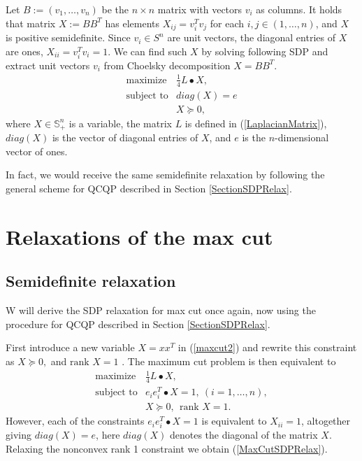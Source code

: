 \documentclass[12pt]{book}
\theoremstyle{definition}
\begin{document}
Let $B := (v_1,\dots ,v_n)$ be the $n\times n$ matrix with vectors $v_i$ as columns. 
It holds that matrix $X:= BB^T$ has elements $ X_{ij} = v_i^Tv_j $ for each $i,j\in (1,\dots,n)$, and $X$ is positive semidefinite.
Since $v_i\in S^n$ are unit vectors, the diagonal entries of $X$ are ones, $X_{ii} = v_i^Tv_i = 1$.
We can find such $X$ by solving following SDP and extract unit vectors $v_i$ from Choelsky decomposition $X = BB^T$.
\begin{equation}
\label{MaxCutSDPRelax}
\begin{array}{ll}
\mbox{maximize} & \frac{1}{4}L\bullet X, \\
\mbox{subject to} & diag(X) = e \\
&	X\succeq 0,
\end{array}
\end{equation} 
where $X\in\mathbb{S}^n_+$ is a variable, the matrix $L$ is defined in (\ref{LaplacianMatrix}), $diag(X)$ is the vector of diagonal entries of $X$, and $e$ is the $n$-dimensional vector of ones.

\rem In fact, we would receive the same semidefinite relaxation by following the general scheme for QCQP described in Section \ref{SectionSDPRelax}.


\section{Relaxations of the max cut}
\label{SectionMaxCutRelaxation}


\subsection{Semidefinite relaxation}
W will derive the SDP relaxation for max cut once again, now using the procedure for QCQP described in Section \ref{SectionSDPRelax}.

First introduce a new variable $X = xx^T$ in (\ref{maxcut2})  and rewrite this constraint as $X\succeq 0,$ and $\mbox{rank }X = 1$ . The maximum cut problem is then equivalent to 
\begin{equation}
\label{maxcutstandardSDPstep1}
\begin{array}{ll}
\mbox{maximize} & \frac{1}{4}L\bullet X, \\
\mbox{subject to} & e_ie_i^T\bullet X = 1, \ (i = 1,\dots ,n), \\
				&	X\succeq 0, \ \ \mbox{rank }X = 1.
\end{array}
\end{equation}
However, each of the constraints $e_ie_i^T\bullet X = 1$ is equivalent to $X_{ii} = 1$, altogether giving $diag(X) = e$, here $diag(X)$ denotes the diagonal of the matrix $X$.
Relaxing the nonconvex rank 1 constraint we obtain  (\ref{MaxCutSDPRelax}). 
\end{document}
